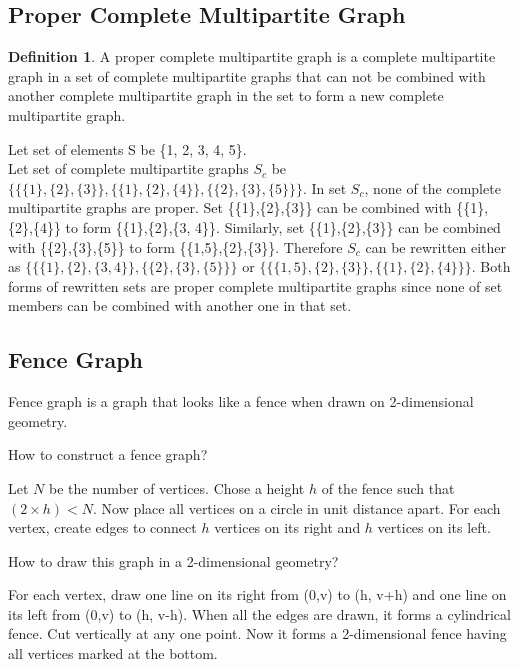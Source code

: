 \documentclass[12pt]{article}
\theoremstyle{plain}
\theoremstyle{definition}
\newtheorem{definition}{Definition}[section]
\begin{document}
\subsection{Proper Complete Multipartite Graph} \label{ProperCompleteMultipartiteGraph}
\begin{definition}
	A proper complete multipartite graph is a complete multipartite graph in a set of complete multipartite graphs that can not be combined with another complete multipartite graph in the set to form a new complete multipartite graph.
\end{definition}

Let set of elements S be \{1, 2, 3, 4, 5\}. \\
Let set of complete multipartite graphs $S_c$ be $\{\{\{1\},\{2\},\{3\}\}, \{\{1\},\{2\},\{4\}\}, \{\{2\},\{3\},\{5\}\}\}$. In set $S_c$, none of the complete multipartite graphs are proper. Set \{\{1\},\{2\},\{3\}\} can be combined with \{\{1\},\{2\},\{4\}\} to form \{\{1\},\{2\},\{3, 4\}\}. Similarly, set \{\{1\},\{2\},\{3\}\} can be combined with \{\{2\},\{3\},\{5\}\} to form \{\{1,5\},\{2\},\{3\}\}. Therefore $S_c$ can be rewritten either as $\{\{\{1\},\{2\},\{3, 4\}\}, \{\{2\},\{3\},\{5\}\}\}$ or $\{\{\{1,5\},\{2\},\{3\}\}, \{\{1\},\{2\},\{4\}\}\}$. Both forms of rewritten sets are proper complete multipartite graphs since none of set members can be combined with another one in that set.

\subsection{Fence Graph} \label{FenceGraph}
Fence graph is a graph that looks like a fence when drawn on 2-dimensional geometry.

How to construct a fence graph?

Let $N$ be the number of vertices. Chose a height $h$ of the fence such that $(2 \times h) < N$. Now place all vertices on a circle in unit distance apart. For each vertex, create edges to connect $h$ vertices on its right and $h$ vertices on its left. 

How to draw this graph in a 2-dimensional geometry?

For each vertex, draw one line on its right from (0,v) to (h, v+h)  and one line on its left from (0,v) to (h, v-h). When all the edges are drawn, it forms a cylindrical fence. Cut vertically at any one point. Now it forms a 2-dimensional fence having all vertices marked at the bottom.
\end{document}
